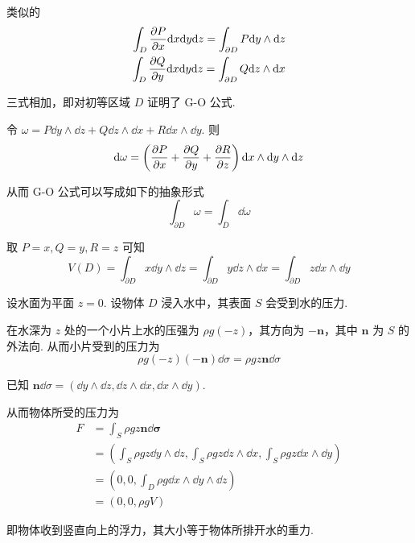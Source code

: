 类似的
$$
\begin{aligned}
    \int_D\frac{\partial{P}}{\partial{x}}\mathrm{d} x\mathrm{d} y\mathrm{d} z=\int_{\partial D}P\mathrm{d} y\wedge\mathrm{d} z\\
    \int_D\frac{\partial{Q}}{\partial{y}}\mathrm{d} x\mathrm{d} y\mathrm{d} z=\int_{\partial D}Q\mathrm{d} z\wedge\mathrm{d} x
\end{aligned}
$$

三式相加，即对初等区域 $D$ 证明了 G-O 公式.

\begin{hint}
    令 $\omega=P\dd y\wedge\dd z+Q\dd z\wedge\dd x+R\dd x\wedge\dd y$. 则
$$
\mathrm{d}\omega=\left(\frac{\partial{P}}{\partial{x}}+\frac{\partial{Q}}{\partial{y}}+\frac{\partial{R}}{\partial{z}}\right)\mathrm{d} x\wedge\mathrm{d} y\wedge\mathrm{d} z
$$

    从而 G-O 公式可以写成如下的抽象形式
$$
\int_{\partial D}\omega=\int_{\overline{D}}\dd\omega
$$
\end{hint}

\begin{example}
    取 $P=x,Q=y,R=z$ 可知
$$
V(D)=\int_{\partial D}x\dd y\wedge\dd z=\int_{\partial D}y\dd z\wedge\dd x=\int_{\partial D}z\dd x\wedge\dd y
$$
\end{example}

\begin{example}[ 椭球的体积]
\end{example}

\begin{example}
    设水面为平面 $z=0$. 设物体 $D$ 浸入水中，其表面 $S$ 会受到水的压力.


    在水深为 $z$ 处的一个小片上水的压强为 $\rho g(-z)$，其方向为 $-\mathbf{n}$，其中 $\mathbf{n}$ 为 $S$ 的外法向. 从而小片受到的压力为
$$
\rho g(-z)(-\mathbf{n})\dd\sigma=\rho gz\mathbf{n}\dd\sigma
$$

    已知 $\mathbf{n}\dd\sigma=(\dd y\wedge\dd z,\dd z\wedge\dd x,\dd x\wedge\dd y)$.

    从而物体所受的压力为
$$
\begin{aligned}
    F&=\int_S\rho g z\mathbf{n}\dd\bm{\sigma}\\
    &=\left(\int_S\rho g z\dd y\wedge\dd z,\int_S\rho g z\dd z\wedge\dd x,\int_S\rho g z\dd x\wedge\dd y\right)\\
    &=\left(0,0,\int_D\rho g\dd x\wedge\dd y\wedge\dd z\right)\\
    &=(0,0,\rho g V)
\end{aligned}
$$

    即物体收到竖直向上的浮力，其大小等于物体所排开水的重力.
\end{example}

